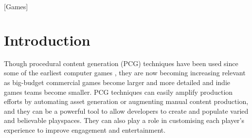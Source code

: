 \documentclass{acm_proc_article-sp}
\begin{document}
\begin{abstract}
\end{abstract}

[Games]



\section{Introduction}

Though procedural content generation (PCG) techniques have been used since some of the earliest computer games \cite{elite}, they are now becoming increasing relevant as big-budget commercial games become larger and more detailed and indie games teams become smaller. PCG techniques can easily amplify production efforts by automating asset generation or augmenting manual content production, and they can be a powerful tool to allow developers to create and populate varied and believable playspaces. They can also play a role in customising each player's experience to improve engagement and entertainment. 
\end{document}
